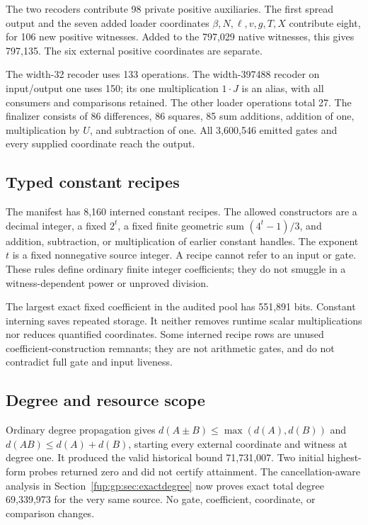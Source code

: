 \documentclass[11pt,letterpaper]{article}
\theoremstyle{definition}\newtheorem{definition}[theorem]{Definition}
\theoremstyle{remark}\newtheorem{remark}[theorem]{Remark}
\begin{document}
The two recoders contribute 98 private positive auxiliaries. The first spread output and the seven added loader coordinates $\beta,N,\ell,v,g,T,X$ contribute eight, for 106 new positive witnesses. Added to the 797,029 native witnesses, this gives 797,135. The six external positive coordinates are separate.

The width-32 recoder uses 133 operations. The width-397488 recoder on input/output one uses 150; its one multiplication $1\cdot J$ is an alias, with all consumers and comparisons retained. The other loader operations total 27. The finalizer consists of 86 differences, 86 squares, 85 sum additions, addition of one, multiplication by $U$, and subtraction of one. All 3,600,546 emitted gates and every supplied coordinate reach the output.

\subsection{Typed constant recipes}
The manifest has 8,160 interned constant recipes. The allowed constructors are a decimal integer, a fixed $2^t$, a fixed finite geometric sum $(4^t-1)/3$, and addition, subtraction, or multiplication of earlier constant handles. The exponent $t$ is a fixed nonnegative source integer. A recipe cannot refer to an input or gate. These rules define ordinary finite integer coefficients; they do not smuggle in a witness-dependent power or unproved division.

The largest exact fixed coefficient in the audited pool has 551,891 bits. Constant interning saves repeated storage. It neither removes runtime scalar multiplications nor reduces quantified coordinates. Some interned recipe rows are unused coefficient-construction remnants; they are not arithmetic gates, and do not contradict full gate and input liveness.

\subsection{Degree and resource scope}
Ordinary degree propagation gives $d(A\pm B)\le\max(d(A),d(B))$ and $d(AB)\le d(A)+d(B)$, starting every external coordinate and witness at degree one. It produced the valid historical bound 71,731,007. Two initial highest-form probes returned zero and did not certify attainment. The cancellation-aware analysis in Section~\ref{fup:gp:sec:exactdegree} now proves exact total degree 69,339,973 for the very same source. No gate, coefficient, coordinate, or comparison changes.
\end{document}
